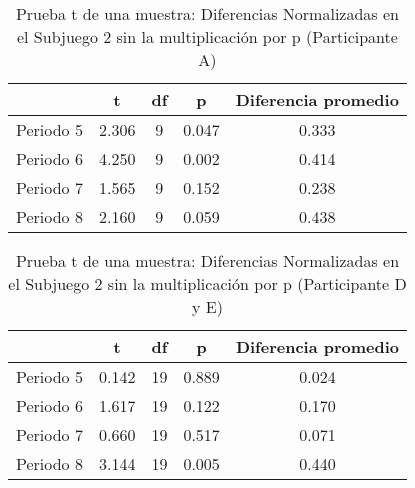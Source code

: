 \begin{table}[h]
\caption[Prueba t de una muestra: Diferencias Normalizadas en el Subjuego 2 sin la multiplicación por $p$ (Participante A)]{Prueba t de una muestra: Diferencias Normalizadas en el Subjuego 2 sin la multiplicación por p (Participante A)}
\label{DN-S1}
\centering
\begin{tabular}{l | c c c | c}
\toprule
\textbf{} & \textbf{t} & \textbf{df} & \textbf{p} & \textbf{Diferencia promedio}\\
\midrule
Periodo 5 & 2.306 & 9 & 0.047 & 0.333\\
Periodo 6 & 4.250 & 9 & 0.002 & 0.414\\
Periodo 7 & 1.565 & 9 & 0.152 & 0.238\\
Periodo 8 & 2.160 & 9 & 0.059 & 0.438\\
\bottomrule
\end{tabular}
\end{table}













\begin{table}[h]
\caption[Prueba t de una muestra: Diferencias Normalizadas en el Subjuego 2 sin la multiplicación por $p$ (Participantes D y E)]{Prueba t de una muestra: Diferencias Normalizadas en el Subjuego 2 sin la multiplicación por p (Participante D y E)}
\label{DN-S1}
\centering
\begin{tabular}{l | c c c | c}
\toprule
\textbf{} & \textbf{t} & \textbf{df} & \textbf{p} & \textbf{Diferencia promedio}\\
\midrule
Periodo 5 & 0.142 & 19 & 0.889 & 0.024\\
Periodo 6 & 1.617 & 19 & 0.122 & 0.170\\
Periodo 7 & 0.660 & 19 & 0.517 & 0.071\\
Periodo 8 & 3.144 & 19 & 0.005 & 0.440\\
\bottomrule
\end{tabular}
\end{table}













